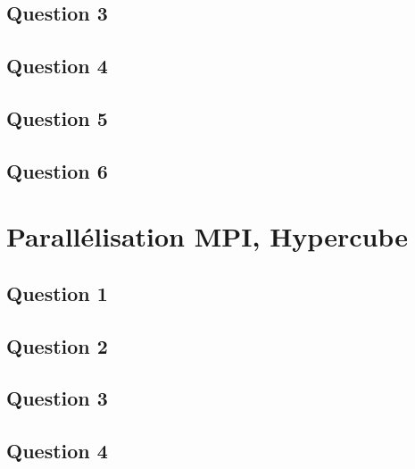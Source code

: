 \documentclass{article}
\begin{document}
\newpage\subsection*{Question 3}

\newpage\subsection*{Question 4}

\newpage\subsection*{Question 5}

\newpage\subsection*{Question 6}



\section{Parallélisation MPI, Hypercube}
\subsection*{Question 1}
\begin{resolution}
    
\end{resolution}

\newpage\subsection*{Question 2}
\begin{resolution}
    
\end{resolution}

\newpage\subsection*{Question 3}
\begin{resolution}
    
\end{resolution}

\newpage\subsection*{Question 4}
\begin{resolution}
    
\end{resolution}
\end{document}
